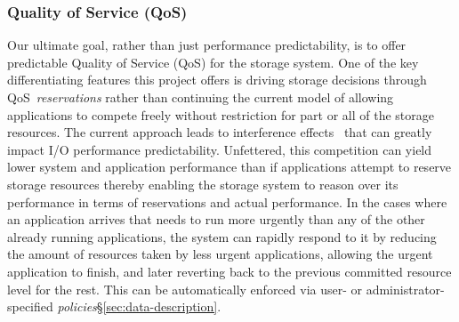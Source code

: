\subsubsection{Quality of Service (QoS)}
Our ultimate goal, rather than just performance predictability, is to offer
predictable Quality of Service (QoS) for the storage system.
One of the key differentiating features this project offers is driving storage
decisions through QoS~\emph{reservations} rather than continuing the current
model of allowing applications to compete freely without restriction for part
or all of the storage resources. The current approach leads to interference
effects~\cite{lofstead:2010:io-variability,liu_hotstorage} that can greatly
impact I/O performance predictability. 
Unfettered, this competition can yield lower system and application performance
than if applications attempt to reserve storage resources thereby enabling the
storage system to reason over its performance in terms of reservations and
actual performance.  In the cases where an application arrives that needs to
run more urgently than any of the other already running applications, the
system can rapidly respond to it by reducing the amount of resources taken by
less urgent applications, allowing the urgent application to finish, and later
reverting back to the previous committed resource level for the rest.  This can
be automatically enforced via user- or administrator- specified
\textit{policies}\S\ref{sec:data-description}.

